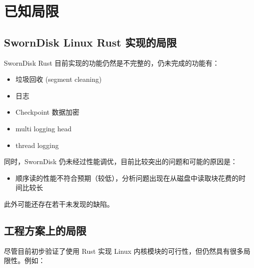 \clearpage

\section{已知局限}

\subsection{SwornDisk Linux Rust 实现的局限}

SwornDisk Rust 目前实现的功能仍然是不完整的，仍未完成的功能有：

\begin{itemize}[itemsep=2pt,topsep=0pt,parsep=0pt]
  \item 垃圾回收 (segment cleaning)
  \item 日志
  \item Checkpoint 数据加密
  \item multi logging head
  \item thread logging
\end{itemize}

同时，SwornDisk 仍未经过性能调优，目前比较突出的问题和可能的原因是：

\begin{itemize}[itemsep=2pt,topsep=0pt,parsep=0pt]
  \item 顺序读的性能不符合预期（较低），分析问题出现在从磁盘中读取块花费的时间比较长
\end{itemize}

此外可能还存在若干未发现的缺陷。

\subsection{工程方案上的局限}

尽管目前初步验证了使用 Rust 实现 Linux 内核模块的可行性，但仍然具有很多局限性。例如：

